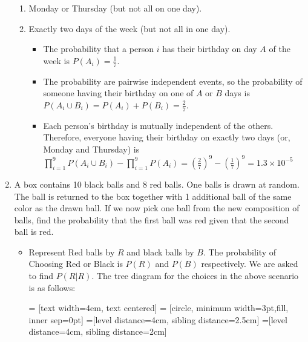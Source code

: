 \documentclass{article}
\begin{document}
\begin{enumerate}
    \begin{enumerate}
    \item Monday or Thursday (but not all on one day).
    \item Exactly two days of the week (but not all in one day).
        \begin{itemize}
        \item The probability that a person $i$ has their birthday on day $A$ of the week is $P(A_i) = \frac{1}{7}$.
        \item The probability are pairwise independent events, so the probability of someone having their birthday on one of $A$ or $B$ days is $P(A_i \cup B_i) = P(A_i) + P(B_i) = \frac{2}{7}$.
        \item Each person's birthday is mutually independent of the others. Therefore, everyone having their birthday on exactly two days (or, Monday and Thursday) is $\prod\limits_{i=1}^9 P(A_i \cup B_i) - \prod\limits_{i=1}^9 P(A_i) = (\frac{2}{7})^9 - (\frac{1}{7})^9 = 1.3 \times 10^{-5}$
        \end{itemize}
    \end{enumerate}
\item A box contains 10 black balls and 8 red balls. One balls is drawn at random. The ball is returned to the box together with 1 additional ball of the same color as the drawn ball. If we now pick one ball from the new composition of balls, find the probability that the first ball was red given that the second ball is red.
    \begin{itemize}
    \item Represent Red balls by $R$ and black balls by $B$. The probability of Choosing Red or Black is $P(R)$ and $P(B)$ respectively. We are asked to find $P(R|R)$. The tree diagram for the choices in the above scenario is as follows:\par
    \begin{minipage}{\linewidth}
        \centering
         = [text width=4em, text centered]
         = [circle, minimum width=3pt,fill, inner sep=0pt]
        =[level distance=4cm, sibling distance=2.5cm]
        =[level distance=4cm, sibling distance=2cm]


\end{minipage}
\end{itemize}
\end{enumerate}
\end{document}
